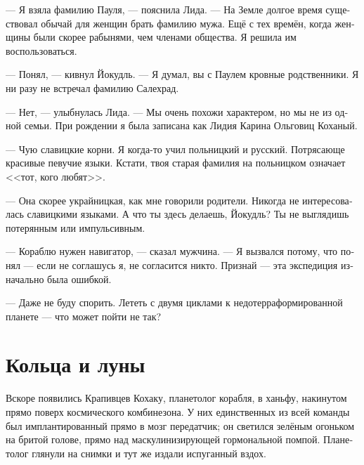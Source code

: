 \documentclass[a4paper,12pt,fleqn]{book}\usepackage{polyglossia}\setdefaultlanguage[babelshorthands=true]{russian}\setotherlanguage{english}\defaultfontfeatures{Ligatures=TeX,Mapping=tex-text}\usepackage{xcolor}\newcommand{\ml}[3]{#2}
\begin{document}
--- Я взяла фамилию Пауля, --- пояснила Лида.
--- На Земле долгое время существовал обычай для женщин брать фамилию мужа.
Ещё с тех времён, когда женщины были скорее рабынями, чем членами общества.
Я решила им воспользоваться.

--- Понял, --- кивнул Йокудль.
--- Я думал, вы с Паулем кровные родственники.
Я ни разу не встречал фамилию Салехрад. %

--- Нет, --- улыбнулась Лида.
--- Мы очень похожи характером, но мы не из одной семьи.
\ml{$0$}
{При рождении я была записана как Лидия Карина Ольговиц Коханый.}
{At birth I was registered as Lidia Karina Olgowitz Kochany.''}

\ml{$0$}
{--- Чую славицкие корни.}
{``I recognize Slawisch roots.}
Я когда-то учил польницкий и русский.
Потрясающе красивые певучие языки.
\ml{$0$}
{Кстати, твоя старая фамилия на польницком означает <<тот, кого любят>>.}
{By the way, your deadname means `the one who are loved' in Polnisch.''}

\ml{$0$}
{--- Она скорее украйницкая, как мне говорили родители.}
{``It's more of Ukrainisch, my parents told me.}
\ml{$0$}
{Никогда не интересовалась славицкими языками.}
{I've never been interested in Slawisch languages.}
\ml{$0$}
{А что ты здесь делаешь, Йокудль?}
{What are you doing here, Jökull?}
\ml{$0$}
{Ты не выглядишь потерянным или импульсивным.}
{You don't look lost or impulsive.''}

--- Кораблю нужен навигатор, --- сказал мужчина.
--- Я вызвался потому, что понял --- если не соглашусь я, не согласится никто.
\ml{$0$}
{Признай --- эта экспедиция изначально была ошибкой.}
{Admit it, this expedition was just a big mistake from the beginning.''}

\ml{$0$}
{--- Даже не буду спорить.}
{``I wouldn't argue with that.}
\ml{$0$}
{Лететь с двумя циклами к недотерраформированной планете --- что может пойти не так?}
{A two-cycle flight to the incompletely terraformed planet, what can go wrong?''}

\section{Кольца и луны}

Вскоре появились Крапивцев Кохаку, планетолог корабля, в ханьфу, накинутом прямо поверх космического комбинезона.
У них единственных из всей команды был имплантированный прямо в мозг передатчик;
он светился зелёным огоньком на бритой голове, прямо над маскулинизирующей гормональной помпой. 
Планетолог глянули на снимки и тут же издали испуганный вздох.
\end{document}
